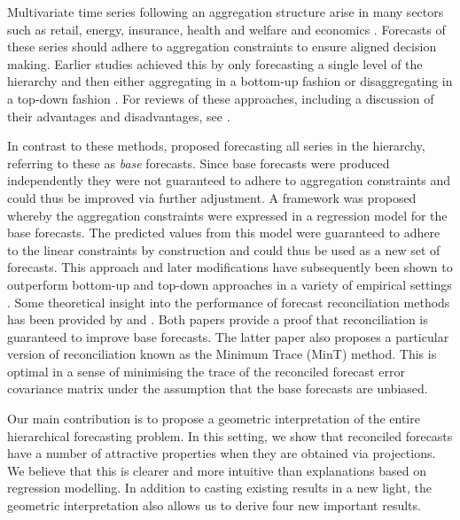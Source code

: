 \documentclass[12pt]{article}
\theoremstyle{definition}
\begin{document}
Multivariate time series following an aggregation structure arise in many sectors such as retail, energy, insurance, health and welfare and economics \citep[see for example][]{KarMal2019, Taieb2017, NysEtAl2020, AlmVan2016, JeoEtAl2019, Mahkya2017, LiTan2019, Shang2017, AthEtAl2019_MacroBook}. Forecasts of these series should adhere to aggregation constraints to ensure aligned decision making. Earlier studies achieved this by only forecasting a single level of the hierarchy and then either aggregating in a bottom-up fashion \citep{Dunn1976} or disaggregating in a top-down fashion \citep{Gross1990, Athanasopoulos2009}. For reviews of these approaches, including a discussion of their advantages and disadvantages, see \citet{Schwarzkopf1988, Kahn1998, Lapide1998, Fliedner2001, Athanasopoulos2009}.

In contrast to these methods, \citet{Hyndman2011} proposed forecasting all series in the hierarchy, referring to these as \emph{base} forecasts. Since base forecasts were produced independently they were not guaranteed to adhere to aggregation constraints and could thus be improved via further adjustment. A framework was proposed whereby the aggregation constraints were expressed in a regression model for the base forecasts. The predicted values from this model were guaranteed to adhere to the linear constraints by construction and could thus be used as a new set of forecasts. This approach and later modifications have subsequently been shown to outperform bottom-up and top-down approaches in a variety of empirical settings \citep[see for example][among others]{Athanasopoulos2009, AthEtAl2017, WicEtAl2019}. Some theoretical insight into the performance of forecast reconciliation methods has been provided by \citet{VanErven2015a} and \citet{WicEtAl2019}. Both papers provide a proof that reconciliation is guaranteed to improve base forecasts. The latter paper also proposes a particular version of reconciliation known as the Minimum Trace (MinT) method. This is optimal in a sense of minimising the trace of the reconciled forecast error covariance matrix under the assumption that the base forecasts are unbiased.

Our main contribution is to propose a geometric interpretation of the entire hierarchical forecasting problem. In this setting, we show that reconciled forecasts have a number of attractive properties when they are obtained via projections. We believe that this is clearer and more intuitive than explanations based on regression modelling. In addition to casting existing results in a new light, the geometric interpretation also allows us to derive {\color{blue}four} new important results.
\end{document}
